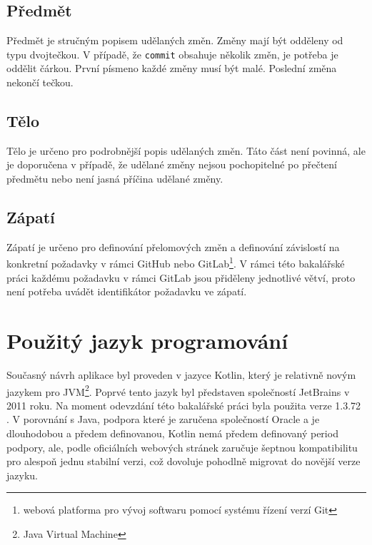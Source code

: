     \subsection{Předmět}
        Předmět je stručným popisem udělaných změn. Změny mají být odděleny od typu dvojtečkou. V případě, že \verb|commit| obsahuje několik změn, je potřeba je oddělit čárkou. První písmeno každé změny musí být malé. Poslední změna nekončí tečkou.
    
    \subsection{Tělo}
        Tělo je určeno pro podrobnější popis udělaných změn. Táto část není povinná, ale je doporučena v případě, že udělané změny nejsou pochopitelné po přečtení předmětu nebo není jasná příčina udělané změny.
    
    \subsection{Zápatí}
        Zápatí je určeno pro definování přelomových změn a definování závislostí na konkretní požadavky v rámci GitHub nebo GitLab\footnote{webová platforma pro vývoj softwaru pomocí systému řízení verzí Git}. V rámci této bakalářské práci každému požadavku v rámci GitLab jsou přiděleny jednotlivé větví, proto není potřeba uvádět identifikátor požadavku ve zápatí.
    
\section{Použitý jazyk programování}\label{resere:kotlin}
    Současný návrh aplikace byl proveden v jazyce Kotlin, který je relativně novým jazykem pro JVM\footnote{Java Virtual Machine}. Poprvé tento jazyk byl představen společností JetBrains v 2011 roku. Na moment odevzdání této bakalářské práci byla použita verze 1.3.72 . V porovnání s Java, podpora které je zaručena společností Oracle  a je dlouhodobou a předem definovanou, Kotlin nemá předem definovaný period podpory, ale, podle oficiálních webových stránek zaručuje šeptnou kompatibilitu pro alespoň jednu stabilní verzi, což dovoluje pohodlně migrovat do novější verze jazyku\cite{java-support-period}\cite{kotlin-compatibility}.
    
    
